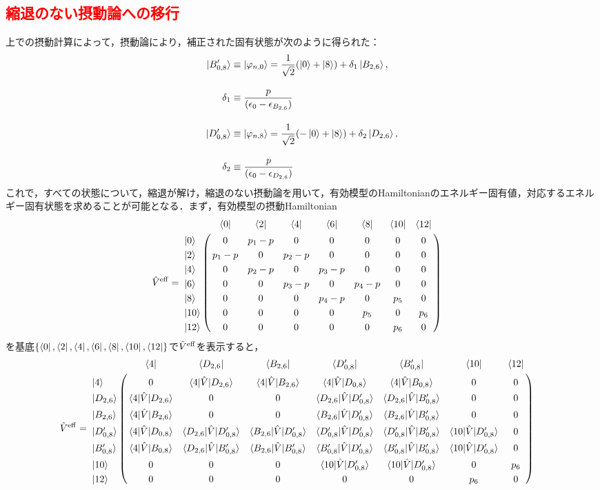 \subsection{\textcolor{red}{縮退のない摂動論への移行}}
上での摂動計算によって，摂動論により，補正された固有状態が次のように得られた：
\begin{align}
    \ket{B_{0,8}^{\prime}}
    &\equiv\ket{\varphi_{n,0}}
     = \frac{1}{\sqrt{2}}(\ket{0}+\ket{8}) + \delta_1\ket{B_{2,6}},\\[10pt]
     \delta_1 &\equiv \frac{p}{(\epsilon_0-\epsilon_{B_{2,6}})}\\[10pt]
    \ket{D_{0,8}^{\prime}}
    &\equiv\ket{\varphi_{n,8}}
     = \frac{1}{\sqrt{2}}(-\ket{0}+\ket{8}) + \delta_2\ket{D_{2,6}},\\[10pt]
     \delta_2 &\equiv \frac{p}{(\epsilon_0-\epsilon_{D_{2,6}})}
\end{align}
これで，すべての状態について，縮退が解け，縮退のない摂動論を用いて，有効模型のHamiltonianのエネルギー固有値，対応するエネルギー固有状態を求めることが可能となる．まず，有効模型の摂動Hamiltonian
\begin{align}
  \hat{V}^{\rm{eff}}&=
   \bordermatrix{     
    & \bra{0} &  \bra{2} &  \bra{4}&  \bra{6}&  \bra{8} &\bra{10} &\bra{12}\cr
   \ket{0}&0&p_1-p&0&0&0&0&0\cr
  \ket{2}&p_1-p&0&p_2-p&0&0&0&0\cr
  \ket{4}&0&p_2-p&0&p_3-p&0&0&0\cr
  \ket{6}&0&0&p_3-p&0&p_4-p&0&0\cr
  \ket{8}&0&0&0&p_4-p&0&p_5&0\cr
  \ket{10}&0&0&0&0&p_5&0&p_6\cr
  \ket{12}&0&0&0&0&0&p_6&0\cr}
\end{align}
を基底$\{\bra{0},  \bra{2},  \bra{4}, \bra{6},  \bra{8}, \bra{10}, \bra{12}\}$で$\hat{V}^{\rm{eff}}$を表示すると，
\begin{align}
  \hat{V}^{\rm{eff}}&=
   \bordermatrix{     
    & \bra{4} &  \bra{D_{2,6}} &  \bra{B_{2,6}}&  \bra{D^\prime_{0,8}}&  \bra{B^\prime_{0,8}} &\bra{10} &\bra{12}\cr
   \ket{4}&0&\langle{4|\hat{V}|D_{2,6}}\rangle&\langle{4|\hat{V}|B_{2,6}}\rangle&\langle{4|\hat{V}|D_{0,8}}\rangle&\langle{4|\hat{V}|B_{0,8}}\rangle&0&0\cr
  \ket{D_{2,6}}&\langle{4|\hat{V}|D_{2,6}}\rangle&0&0&\langle{D_{2,6}|\hat{V}|D^\prime_{0,8}}\rangle&\langle{D_{2,6}|\hat{V}|B^\prime_{0,8}}\rangle&0&0\cr
  \ket{B_{2,6}}&\langle{4|\hat{V}|B_{2,6}}\rangle&0&0&\langle{B_{2,6}|\hat{V}|D^\prime_{0,8}}\rangle&\langle{B_{2,6}|\hat{V}|B^\prime_{0,8}}\rangle&0&0\cr
  \ket{D^\prime_{0,8}}&\langle{4|\hat{V}|D_{0,8}}\rangle&\langle{D_{2,6}|\hat{V}|D^\prime_{0,8}}\rangle&\langle{B_{2,6}|\hat{V}|D^\prime_{0,8}}\rangle& \langle{D^\prime_{0,8}|\hat{V}|D^\prime_{0,8}}\rangle& \langle{D^\prime_{0,8}|\hat{V}|B^\prime_{0,8}}\rangle&\langle{10|\hat{V}|D^\prime_{0,8}}\rangle&0\cr
  \ket{B^\prime_{0,8}}&\langle{4|\hat{V}|B_{0,8}}\rangle&\langle{D_{2,6}|\hat{V}|B^\prime_{0,8}}\rangle&\langle{B_{2,6}|\hat{V}|B^\prime_{0,8}}\rangle& \langle{B^\prime_{0,8}|\hat{V}|D^\prime_{0,8}}\rangle& \langle{B^\prime_{0,8}|\hat{V}|B^\prime_{0,8}}\rangle&\langle{10|\hat{V}|D^\prime_{0,8}}\rangle&0\cr
  \ket{10}&0&0&0&\langle{10|\hat{V}|D^\prime_{0,8}}\rangle&\langle{10|\hat{V}|D^\prime_{0,8}}\rangle&0&p_6\cr
  \ket{12}&0&0&0&0&0&p_6&0\cr}
\end{align}
